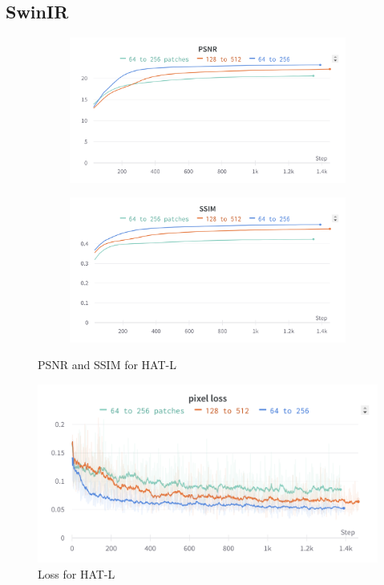 \subsection{SwinIR}
\label{subsec:training_swinir}
\begin{figure}[H]
  \centering
  \begin{subfigure}{.5\textwidth}
    \centering
    \includegraphics[width=1\linewidth]{figures/swinir_psnr.png}
    \label{fig:swinir_psnr}
  \end{subfigure}%
  \begin{subfigure}{.5\textwidth}
    \centering
    \includegraphics[width=1\linewidth]{figures/swinir_ssim.png}
    \label{fig:swinir_ssim}
  \end{subfigure}
  \caption{PSNR and SSIM for HAT-L}
  \label{fig:swinir_metrics}
\end{figure}

\begin{figure}[H]
  \centering
  \includegraphics[scale=0.14]{figures/swinir_loss.png}
  \caption{Loss for HAT-L}
  \label{img:swinir_loss}
\end{figure}

